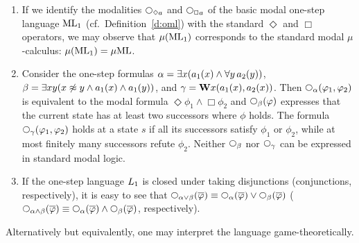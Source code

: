 \begin{example}
\label{ex:mul1}
\begin{enumerate}[(1)]
\item
If we identify the modalities $\nxt{\Diamond a}$ and $\nxt{\Box a}$ of the basic
modal one-step language $\mathrm{ML}_1$ (cf.~Definition~\ref{d:oml}) with the standard
$\Diamond$ and $\Box$ operators, we may observe that $\mu(\mathrm{ML}_1)$ corresponds to
the standard modal $\mu$-calculus: $\mu(\mathrm{ML}_1) = \mu\mathrm{ML}$.
\item
Consider the one-step formulas 
$\alpha = \exists x (a_{1}(x) \land \forall y\, a_{2}(y))$,
$\beta = \exists x y (x \not\approx y \land a_{1}(x) \land a_{1}(y))$, and
$\gamma = \mathbf{W} x (a_{1}(x), a_{2}(x))$.
Then $\nxt{\al}(\phi_{1},\phi_{2})$ is equivalent to the modal formula
$\Diamond \phi_{1} \land \Box \phi_{2}$ and 
$\nxt{\beta}(\phi)$ expresses that the current state has at least two 
successors where $\phi$ holds.
The formula $\nxt{\gamma}(\phi_{1},\phi_{2})$ holds at a state $s$ if all 
its successors satisfy $\phi_{1}$ or $\phi_{2}$, while at most finitely
many successors refute $\phi_{2}$.
Neither $\nxt{\beta}$ nor $\nxt{\gamma}$ can be expressed in standard modal 
logic.
\item
If the one-step language $L_{1}$ is closed under taking disjunctions  
(conjunctions, respectively), it is easy to see that 
$\nxt{\al\lor\beta}(\ol{\phi}) \equiv \nxt{\al}(\ol{\phi}) \lor 
\nxt{\beta}(\ol{\phi})$ 
($\nxt{\al\land\beta}(\ol{\phi}) \equiv \nxt{\al}(\ol{\phi}) \land 
\nxt{\beta}(\ol{\phi})$, respectively).
\end{enumerate}
\end{example}

Alternatively but equivalently, one may interpret the language
game-theoretically.

